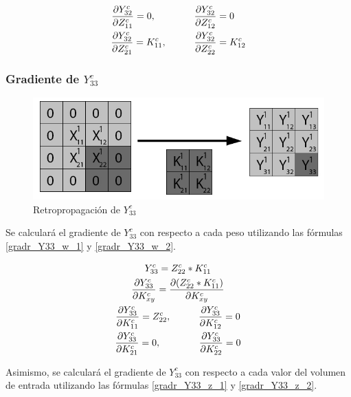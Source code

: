 \begin{gather}
	\frac{\partial Y^c_{32}}{\partial Z^c_{11}} = 0, \hspace{14mm} \frac{\partial Y^c_{32}}{\partial Z^c_{12}} = 0 \hspace{4mm} \label{gradr_Y32_z_1} \\
	\frac{\partial Y^c_{32}}{\partial Z^c_{21}} = K^c_{11}, \hspace{10mm} \frac{\partial Y^c_{32}}{\partial Z^c_{22}} = K^c_{12} \label{gradr_Y32_z_2}
\end{gather}



\subsubsection{Gradiente de $Y^c_{33}$}

\begin{figure}[H]
	\centering
	\includegraphics[width=0.8\linewidth]{imagenes/conv_back_padding_9.jpg} 
	\caption{Retropropagación de $Y^c_{33}$}
\end{figure}

Se calculará el gradiente de $Y^c_{33}$ con respecto a cada peso utilizando las fórmulas \ref{gradr_Y33_w_1} y \ref{gradr_Y33_w_2}.


\begin{gather}
	Y^c_{33} = Z^c_{22} * K^c_{11} \\
	\frac{\partial Y^c_{33}}{\partial K^c_{xy}} = \frac{\partial (Z^c_{22} * K^c_{11})}{\partial K^c_{xy}} \\
	\frac{\partial Y^c_{33}}{\partial K^c_{11}} = Z^c_{22}, \hspace{10mm} \frac{\partial Y^c_{33}}{\partial K^c_{12}} = 0 \label{gradr_Y33_w_1} \\
	\frac{\partial Y^c_{33}}{\partial K^c_{21}} = 0, \hspace{14mm} \frac{\partial Y^c_{33}}{\partial K^c_{22}} = 0 \label{gradr_Y33_w_2}
\end{gather}

Asimismo, se calculará el gradiente de $Y^c_{33}$ con respecto a cada valor del volumen de entrada utilizando las fórmulas \ref{gradr_Y33_z_1} y \ref{gradr_Y33_z_2}.


